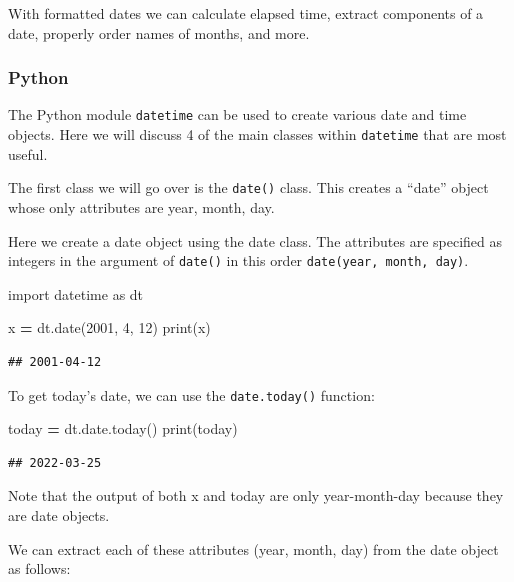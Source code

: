 \documentclass[
]{book}
\newenvironment{Shaded}{\begin{snugshade}}{\end{snugshade}}
\newcommand{\BuiltInTok}[1]{#1}
\newcommand{\DecValTok}[1]{\textcolor[rgb]{0.00,0.00,0.81}{#1}}
\newcommand{\ImportTok}[1]{#1}
\newcommand{\NormalTok}[1]{#1}
\newcommand{\OperatorTok}[1]{\textcolor[rgb]{0.81,0.36,0.00}{\textbf{#1}}}
\begin{document}
With formatted dates we can calculate elapsed time, extract components of a date, properly order names of months, and more.

\hypertarget{python-28}{%
\subsubsection*{Python}\label{python-28}}

The Python module \texttt{datetime} can be used to create various date and time objects. Here we will discuss 4 of the main classes within \texttt{datetime} that are most useful.

The first class we will go over is the \texttt{date()} class. This creates a ``date'' object whose only attributes are year, month, day.

Here we create a date object using the date class. The attributes are specified as integers in the argument of \texttt{date()} in this order \texttt{date(year,\ month,\ day)}.

\begin{Shaded}
\begin{Highlighting}[]
\ImportTok{import}\NormalTok{ datetime }\ImportTok{as}\NormalTok{ dt }

\NormalTok{x }\OperatorTok{=}\NormalTok{ dt.date(}\DecValTok{2001}\NormalTok{, }\DecValTok{4}\NormalTok{, }\DecValTok{12}\NormalTok{)}
\BuiltInTok{print}\NormalTok{(x)}
\end{Highlighting}
\end{Shaded}

\begin{verbatim}
## 2001-04-12
\end{verbatim}

To get today's date, we can use the \texttt{date.today()} function:

\begin{Shaded}
\begin{Highlighting}[]
\NormalTok{today }\OperatorTok{=}\NormalTok{ dt.date.today()}
\BuiltInTok{print}\NormalTok{(today)}
\end{Highlighting}
\end{Shaded}

\begin{verbatim}
## 2022-03-25
\end{verbatim}

Note that the output of both x and today are only year-month-day because they are date objects.

We can extract each of these attributes (year, month, day) from the date object as follows:
\end{document}
